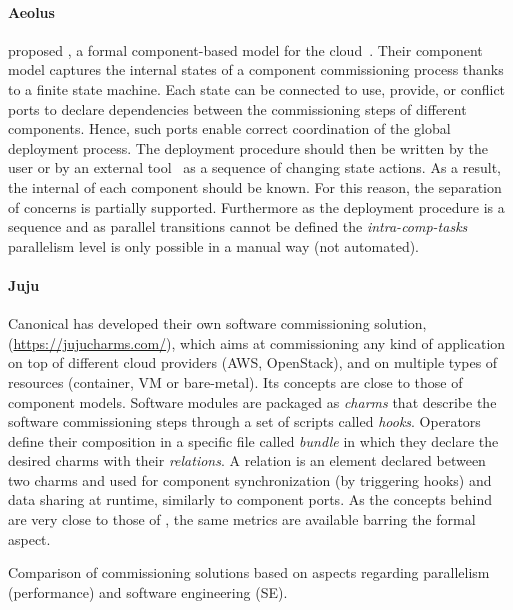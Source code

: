 \paragraph{Aeolus}
\citeauthor{dicosmo2014ic} proposed \aeolus, a formal component-based model for the cloud~\cite{dicosmo2014ic}. Their component model captures the internal states of a component commissioning process thanks to a finite state machine. Each state can be connected to use, provide, or conflict ports to declare dependencies between the commissioning steps of different components. Hence, such ports enable correct coordination of the global deployment process. The deployment procedure should then be written by the user or by an external tool~\cite{dicosmo:hal-01233489} as a sequence of changing state actions. As a result, the internal of each component should be known. For this reason, the separation of concerns is partially supported. Furthermore as the deployment procedure is a sequence and as parallel transitions cannot be defined the \emph{intra-comp-tasks} parallelism level is only possible in a manual way (not automated).

\paragraph{Juju}
Canonical has developed their own software commissioning solution,
\juju (\url{https://jujucharms.com/}), which aims at commissioning any
kind of application on top of different cloud providers (\eg AWS,
OpenStack), and on multiple types of resources (container, VM or
bare-metal). Its concepts are close to those of component models. Software
modules are packaged as \juju \emph{charms} that describe the
software commissioning steps through a set of scripts called
\emph{hooks}. Operators define their composition in a specific file
called \emph{bundle} in which they declare the desired charms with
their \emph{relations}. A relation is an element declared between two
charms and used for component synchronization (by triggering hooks)
and data sharing at runtime, similarly to component ports. As the
concepts behind \juju are very close to those of \aeolus, the same
metrics are available barring the formal aspect.

\begin{table*}[tp]
  \centering
  \small
  
  \caption{Comparison of commissioning solutions based on aspects
  regarding parallelism (performance) and software engineering (SE).}
  \label{tab:comparison}
\end{table*}

